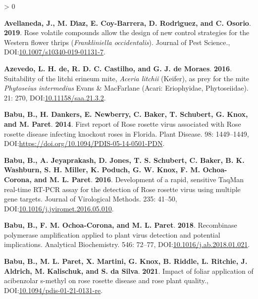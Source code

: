 \documentclass{ufdissertation}[overrideChapters] %
\newlength{\cslhangindent}
\newenvironment{CSLReferences}[2] %
 {%
  \setlength{\parindent}{0pt}
  \ifodd #1 \everypar{\setlength{\hangindent}{\cslhangindent}}\ignorespaces\fi
  \ifnum #2 > 0
  \setlength{\parskip}{#2\baselineskip}
  \fi
 }%
 {}
\begin{document}
{\begin{CSLReferences}{1}{1}
\leavevmode{}%
\textbf{Avellaneda, J., M. Dı́az, E. Coy-Barrera, D. Rodrı́guez, and C. Osorio}. \textbf{2019}. Rose volatile compounds allow the design of new control strategies for the {Western flower thrips} ({\emph{Frankliniella occidentalis}}). Journal of Pest Science., DOI:\href{https://doi.org/10.1007/s10340-019-01131-7}{10.1007/s10340-019-01131-7}.

\leavevmode{}%
\textbf{Azevedo, L. H. de, R. D. C. Castilho, and G. J. de Moraes}. \textbf{2016}. Suitability of the litchi erineum mite, {\emph{Aceria litchii}} ({Keifer}), as prey for the mite {\emph{Phytoseius intermedius}} {Evans} \& {MacFarlane} ({Acari}: {Eriophyidae}, {Phytoseiidae}). 21: 270, DOI:\href{https://doi.org/10.11158/saa.21.3.2}{10.11158/saa.21.3.2}.

\leavevmode{}%
\textbf{Babu, B., H. Dankers, E. Newberry, C. Baker, T. Schubert, G. Knox, and M. Paret}. \textbf{2014}. First report of {Rose rosette virus} associated with {Rose rosette disease} infecting knockout roses in {Florida}. Plant Disease. 98: 1449--1449, DOI:\url{https://doi.org/10.1094/PDIS-05-14-0501-PDN}.

\leavevmode{}%
\textbf{Babu, B., A. Jeyaprakash, D. Jones, T. S. Schubert, C. Baker, B. K. Washburn, S. H. Miller, K. Poduch, G. W. Knox, F. M. Ochoa-Corona, and M. L. Paret}. \textbf{2016}. Development of a rapid, sensitive {TaqMan} real-time {RT}-{PCR} assay for the detection of {Rose rosette virus} using multiple gene targets. Journal of Virological Methods. 235: 41--50, DOI:\href{https://doi.org/10.1016/j.jviromet.2016.05.010}{10.1016/j.jviromet.2016.05.010}.

\leavevmode{}%
\textbf{Babu, B., F. M. Ochoa-Corona, and M. L. Paret}. \textbf{2018}. Recombinase polymerase amplification applied to plant virus detection and potential implications. Analytical Biochemistry. 546: 72--77, DOI:\href{https://doi.org/10.1016/j.ab.2018.01.021}{10.1016/j.ab.2018.01.021}.

\leavevmode{}%
\textbf{Babu, B., M. L. Paret, X. Martini, G. Knox, B. Riddle, L. Ritchie, J. Aldrich, M. Kalischuk, and S. da Silva}. \textbf{2021}. Impact of foliar application of acibenzolar s-methyl on rose rosette disease and rose plant quality., DOI:\href{https://doi.org/10.1094/pdis-01-21-0131-re}{10.1094/pdis-01-21-0131-re}.


\end{CSLReferences}}
\end{document}
